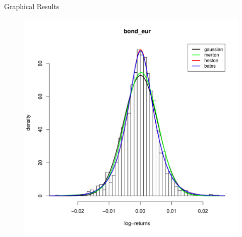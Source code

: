\documentclass[c, 10pt]{beamer}
\begin{document}
\begin{frame}{Graphical Results}
\begin{figure}[ht]
\begin{minipage}[b]{0.45\linewidth}
	\end{minipage}
	\hspace{0.5cm}
	\begin{minipage}[b]{0.45\linewidth}
		\footnotesize
		\centering
		\includegraphics[width=\textwidth]{Images/hist_bond_eur.pdf}
	
	\end{minipage}
\end{figure}
\end{frame}
\end{document}
